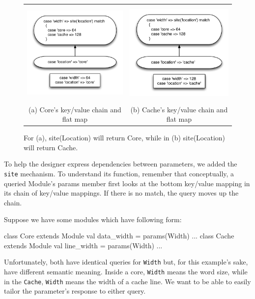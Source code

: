 \documentclass[10pt,twocolumn]{article}
\def\code#1{{\small\tt #1}}
\begin{document}
\begin{figure}
\begin{center}
\begin{tabular}{cc}
\includegraphics[height=2.0in]{figs/sitea} &
\includegraphics[height=2.0in]{figs/siteb} \\
(a) Core's key/value chain and flat map & (b) Cache's key/value chain and flat map \\
\end{tabular}
\end{center}
\caption{For (a), site(Location) will return Core, while in (b) site(Location) will return Cache.}
\label{fig:site}
\end{figure}
To help the designer express dependencies between parameters, we added the \code{site} mechanism. To understand its function, remember that conceptually, a queried Module's params member first looks at the bottom key/value mapping in its chain of key/value mappings. If there is no match, the query moves up the chain. 

Suppose we have some modules which have following form:

\begin{scala}
class Core extends Module {
  val data_width = params(Width)
  ...
}
class Cache extends Module {
  val line_width = params(Width)
  ...
}
\end{scala}
Unfortunately, both have identical queries for \code{Width} but, for this example's sake, have different semantic meaning. Inside a core, \code{Width} means the word size, while in the \code{Cache}, \code{Width} means the width of a cache line. We want to be able to easily tailor the parameter's response to either query.
\end{document}
